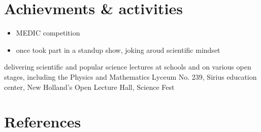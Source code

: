 \documentclass[11pt,a4paper,sans]{moderncv}        %
\begin{document}
\section{Achievments \& activities}

\begin{itemize}
  \item MEDIC competition
  \item once took part in a standup show, joking aroud scientific mindset
\end{itemize}

delivering scientific and popular science lectures at schools and on various open stages, 
including the Physics and Mathematics Lyceum No. 239, Sirius education center, 
New Holland’s Open Lecture Hall, Science Fest

\section{References}








\end{document}

